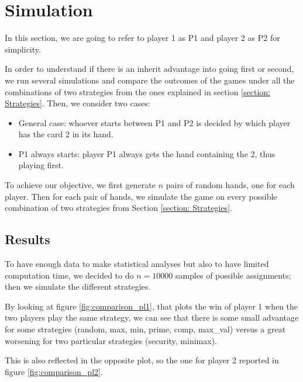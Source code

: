 \section{Simulation} \label{section:Simulation} %
In this section, we are going to refer to player 1 as P1 and player 2 as P2 for simplicity.

In order to understand if there is an inherit advantage into going first or second, we run several simulations and compare the outcomes of the games under all the combinations of two strategies from the ones explained in section \ref{section: Strategies}. Then, we consider two cases:
\begin{itemize}
    \item General case: whoever starts between P1 and P2 is decided by which player has the card 2 in its hand.
    \item P1 always starts: player P1 always gets the hand containing the 2, thus playing first.
\end{itemize}
To achieve our objective, we first generate $n$ pairs of random hands, one for each player. Then for each pair of hands, we simulate the game on every possible combination of two strategies from Section \ref{section: Strategies}.

\subsection{Results} \label{subsection:Results}
To have enough data to make statistical analyses but also to have limited computation time, we decided to do $n = 10000$ samples of possible assignments; then we simulate the different strategies.

By looking at figure \ref{fig:comparison_pl1}, that plots the win of player 1 when the two players play the same strategy, we can see that there is some small advantage for some strategies (random, max, min, prime, comp, max\_val) versus a great worsening for two particular strategies (security, minimax).

This is also reflected in the opposite plot, so the one for player 2 reported in figure \ref{fig:comparison_pl2}.

